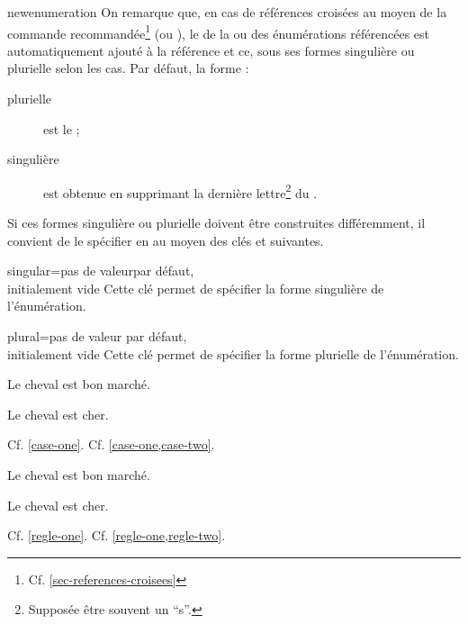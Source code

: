 \documentclass[english,nolocaltoc]{nwejmart}
\newtheorem[style=definition]{fait}
\newtheorem[title=expérience]{experience}
\newtheorem[title-plural=anneaux]{anneau}
\newtheorem[title=idéal,title-plural=idéaux]{ideal}
\begin{document}
\begin{docCommand}[doc new=2019-03-18]{newenumeration}{}
On remarque que, en cas de références croisées au moyen de la commande
recommandée\footnote{Cf. \vref{sec-references-croisees}}  (ou
), le  de la ou des énumérations référencées est
automatiquement ajouté à la référence et ce, sous ses formes singulière ou
plurielle selon les cas. Par défaut, la forme :
\begin{description}
\item[plurielle] est le  ;
\item[singulière] est obtenue en supprimant la dernière lettre\footnote{Supposée être
  souvent un \enquote{s}.} du .
\end{description}
Si ces formes singulière ou plurielle doivent être construites différemment, il
convient de le spécifier en  au moyen des clés
 et  suivantes.
  \begin{docKey}{singular}{={}}{pas de
      valeurpar défaut,\\initialement vide}
    Cette clé permet de spécifier la forme singulière de l'énumération.
  \end{docKey}
  \begin{docKey}{plural}{={}}{pas de
      valeur par défaut,\\initialement vide}
    Cette clé permet de spécifier la forme plurielle de l'énumération.
  \end{docKey}
\begin{preamblecode}
\end{preamblecode}
\begin{bodycode}[listing and text,listing options={deletekeywords={[2]label}}]
\begin{cas}
\item\label{case-one} Le cheval est bon marché.
\item\label{case-two} Le cheval est cher.
\end{cas}
Cf. \vref{case-one}. Cf. \vref{case-one,case-two}.
\end{bodycode}

\begin{preamblecode}
\end{preamblecode}
\begin{bodycode}[listing and text,listing options={deletekeywords={[2]label}}]
\begin{regles}
\item\label{regle-one} Le cheval est bon marché.
\item\label{regle-two} Le cheval est cher.
\end{regles}
Cf. \vref{regle-one}. Cf. \vref{regle-one,regle-two}.
\end{bodycode}
%
\end{docCommand}
\end{document}
